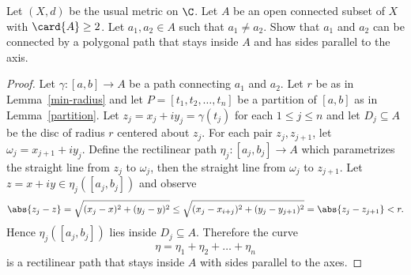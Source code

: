 \documentclass[12pt]{amsart}
\begin{document}
\begin{setup}
  Let $(X,d)$ be the usual metric on $\C$.
  Let $A$ be an open connected subset of $X$ with $\card{A} \geq 2$.
  Let $a_1, a_2 \in A$ such that $a_1 \not = a_2$.
  Show that $a_1$ and $a_2$ can be connected by a polygonal path that stays inside $A$ and has sides parallel to the axis.

  \begin{proof}
    Let $\gamma \colon [a,b] \rightarrow A$ be a path connecting $a_1$ and $a_2$.
    Let $r$ be as in Lemma~\ref{min-radius} and let $P = [t_1, t_2, \ldots, t_n]$ be a partition of $[a,b]$ as in Lemma~\ref{partition}.
    Let $z_j = x_j + iy_j = \gamma(t_j)$ for each $1 \leq j \leq n$ and let $D_j \subseteq A$ be the disc of radius $r$ centered about $z_j$.
    For each pair $z_j, z_{j+1}$, let $\omega_j = x_{j+1} + iy_j$.
    Define the rectilinear path $\eta_j : [a_j, b_j] \rightarrow A$ which parametrizes the straight line from $z_j$ to $\omega_j$, then the straight line from $\omega_j$ to $z_{j+1}$.
    Let $z = x + iy \in \eta_j([a_j, b_j])$ and observe 
    $$\abs{z_j - z} = \sqrt{(x_j - x)^2 + (y_j - y)^2} \leq \sqrt{(x_j - x_{i+j})^2 + (y_j - y_{j+1})^2} = \abs{z_j - z_{j+1}} < r.$$
    Hence $\eta_j([a_j, b_j])$ lies inside $D_j \subseteq A$.
    Therefore the curve $$\eta = \eta_1 + \eta_2 + \ldots + \eta_n$$ is a rectilinear path that stays inside $A$ with sides parallel to the axes.
    
  \end{proof}
\end{setup}
\end{document}
